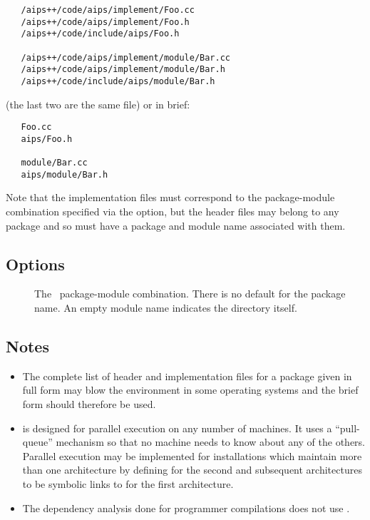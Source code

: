 \begin{verbatim}
   /aips++/code/aips/implement/Foo.cc
   /aips++/code/aips/implement/Foo.h
   /aips++/code/include/aips/Foo.h

   /aips++/code/aips/implement/module/Bar.cc
   /aips++/code/aips/implement/module/Bar.h
   /aips++/code/include/aips/module/Bar.h
\end{verbatim}

\noindent
(the last two are the same file) or in brief:

\begin{verbatim}
   Foo.cc
   aips/Foo.h

   module/Bar.cc
   aips/module/Bar.h
\end{verbatim}

\noindent
Note that the implementation files must correspond to the package-module
combination specified via the  option, but the header files may belong
to any package and so must have a package and module name associated with
them.

\subsection*{Options}

\begin{description}
\item[]
   The \aipspp\ package-module combination.  There is no default for the
   package name.  An empty module name indicates the 
   directory itself.
\end{description}

\subsection*{Notes}

\begin{itemize}
\item
   The complete list of header and implementation files for a package given in
   full form may blow the environment in some operating systems and the brief
   form should therefore be used.

\item
    is designed for parallel execution on any number of machines.
   It uses a ``pull-queue'' mechanism so that no machine needs to know about
   any of the others.  Parallel execution may be implemented for installations
   which maintain more than one architecture by defining  for
   the second and subsequent architectures to be symbolic links to
    for the first architecture.

\item
   The dependency analysis done for programmer compilations does not use
   .
\end{itemize}


